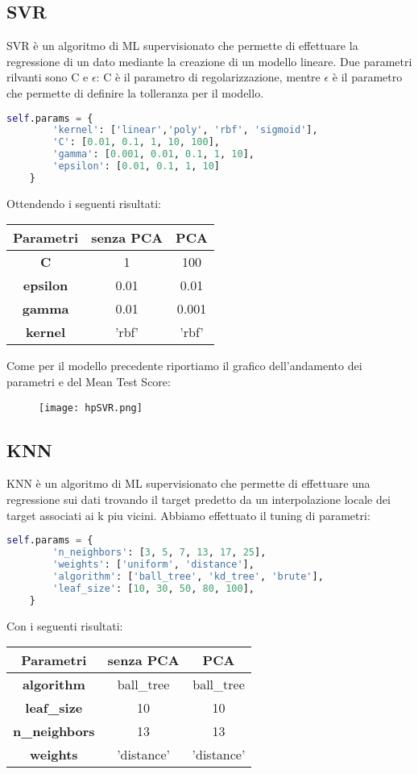 \documentclass[../../Report.tex]{subfiles}
\begin{document}
\subsection{SVR}
SVR è un algoritmo di ML supervisionato che permette di effettuare la regressione di un dato mediante la creazione di un modello lineare.
Due parametri rilvanti sono C e $\epsilon$: C è il parametro di regolarizzazione, mentre $\epsilon$ è il parametro che permette di definire la tolleranza per il modello.
\begin{lstlisting}[language=Python]
    self.params = {
        'kernel': ['linear','poly', 'rbf', 'sigmoid'],
        'C': [0.01, 0.1, 1, 10, 100],
        'gamma': [0.001, 0.01, 0.1, 1, 10],
        'epsilon': [0.01, 0.1, 1, 10]
    }
\end{lstlisting}
Ottendendo i seguenti risultati:
\begin{table}[H]
    \centering
    \begin{tabular}{|c|c|c|}
    \hline
    \textbf{Parametri} & \textbf{senza PCA} & \textbf{PCA} \\ \hline
    \textbf{C}& 1 & 100\\
    \textbf{epsilon}& 0.01 &  0.01 \\
    \textbf{gamma}& 0.01 & 0.001\\
    \textbf{kernel}& 'rbf' &  'rbf'\\
    \hline
\end{tabular}
\end{table}
Come per il modello precedente riportiamo il grafico dell'andamento dei parametri e del Mean Test Score:
\begin{figure}[H]
    \centering
    \texttt{[image: hpSVR.png]}
\end{figure}
\subsection{KNN}
KNN è un algoritmo di ML supervisionato che permette di effettuare una regressione sui dati trovando il target predetto da un interpolazione locale dei target associati ai k piu vicini.
Abbiamo effettuato il tuning di parametri:
\begin{lstlisting}[language=Python]
    self.params = {
        'n_neighbors': [3, 5, 7, 13, 17, 25],
        'weights': ['uniform', 'distance'],
        'algorithm': ['ball_tree', 'kd_tree', 'brute'],
        'leaf_size': [10, 30, 50, 80, 100],
    }
\end{lstlisting}
Con i seguenti risultati:
\begin{table}[H]
    \centering
    \begin{tabular}{|c|c|c|}
    \hline
    \textbf{Parametri} & \textbf{senza PCA} & \textbf{PCA} \\ \hline
    \textbf{algorithm}& ball\_tree & ball\_tree\\
    \textbf{leaf\_size}& 10 &  10 \\
    \textbf{n\_neighbors}& 13 & 13\\
    \textbf{weights}& 'distance' &  'distance'\\
    \hline
\end{tabular}
\end{table}
\end{document}
